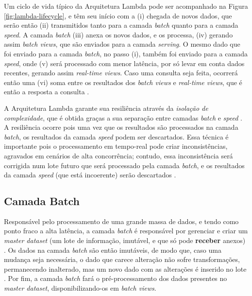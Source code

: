Um ciclo de vida típico da Arquitetura Lambda pode ser acompanhado na Figura
\ref{fig:lambda-lifecycle}, e têm seu início com a (i) chegada
de novos dados, que serão então (ii) transmitidos tanto para a camada
\textit{batch} quanto para a camada \textit{speed}. A camada \textit{batch}
(iii) anexa os novos dados, e os processa, (iv) gerando assim
\textit{batch views}, que são enviados para a camada \textit{serving}. O mesmo
dado que foi enviado para a camada \textit{batch}, no passo (i), também foi
enviado para a camada \textit{speed}, onde (v) será processado com menor latência,
por só levar em conta dados recentes, gerando assim \textit{real-time views}. 
Caso uma consulta seja feita, ocorrerá então uma (vi) soma entre os resultados
dos \textit{batch views} e \textit{real-time views}, que é então a resposta
a consulta \cite{marz2015}.

A Arquitetura Lambda garante sua resiliência através da \textit{isolação de
complexidade}, que é obtida graças a sua separação entre camadas \textit{batch}
e \textit{speed} \cite{marz2015}. A resiliência ocorre pois uma vez que os
resultados são processados na camada \textit{batch}, os resultados da camada
\textit{speed} podem ser descartados. Essa técnica é importante pois o
processamento em tempo-real pode criar inconsistências, agravados em cenários
de alta concorrência; contudo, essa inconsistência será corrigida num lote
futuro que será processado pela camada \textit{batch}, e os resultados
da camada \textit{speed} (que está incoerente) serão descartados \cite{marz2015}.


\subsection{Camada Batch}

Responsável pelo processamento de uma grande massa de dados, e tendo como ponto
fraco a alta latência, a camada \textit{batch} é responsável por gerenciar e
criar um \textit{master dataset} (um lote de informação, imutável, e que só
pode \textbf{receber} anexos) \cite{marz2015}. Os dados na camada \textit{batch}
são então imutáveis, de modo que, caso uma mudança seja necessária, o dado que
carece alteração não sofre transformações, permanecendo inalterado, mas um novo
dado com as alterações é inserido no lote \cite{marz2015}. Por fim, a camada
\textit{batch} fará o pré-processamento dos dados presentes no
\textit{master dataset}, disponibilizando-os em \textit{batch views}.

